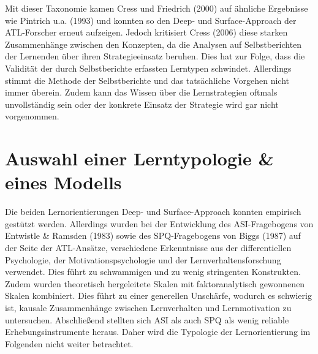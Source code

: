     Mit dieser Taxonomie kamen Cress und Friedrich (2000) auf ähnliche Ergebnisse wie Pintrich u.a. (1993) und konnten so den Deep- und Surface-Approach der ATL-Forscher erneut aufzeigen. Jedoch kritisiert Cress (2006) diese starken Zusammenhänge zwischen den Konzepten, da die Analysen auf Selbstberichten der Lernenden über ihren Strategieeinsatz beruhen. Dies hat zur Folge, dass die Validität der durch Selbstberichte erfassten 
    Lerntypen schwindet. \parencite[370 f.]{Cress.2006} \parencite[15 f.]{Martin.2012} Allerdings stimmt die Methode der Selbstberichte und das tatsächliche Vorgehen nicht immer 
    überein. Zudem kann das Wissen über die Lernstrategien oftmals unvollständig sein oder der konkrete Einsatz der Strategie wird gar nicht vorgenommen. \parencite[148]{Looss.2007}\nocite{Pintrich.1993}

    \section{Auswahl einer Lerntypologie \& eines Modells} \label{AuswahlLernstilmodell}
 
    Die beiden Lernorientierungen Deep- und Surface-Approach konnten empirisch gestützt werden. Allerdings 
    wurden bei der Entwicklung des ASI-Fragebogens von Entwistle \& Ramsden (1983) sowie des SPQ-Fragebogens von Biggs (1987) auf der Seite der ATL-Ansätze,
    verschiedene Erkenntnisse aus der differentiellen Psychologie, der Motivationspsychologie und der Lernverhaltensforschung verwendet.
    Dies führt zu schwammigen und zu wenig stringenten Konstrukten. Zudem wurden theoretisch hergeleitete Skalen mit 
    faktoranalytisch gewonnenen Skalen kombiniert. Dies führt zu einer generellen Unschärfe, wodurch es schwierig ist, kausale Zusammenhänge zwischen Lernverhalten und Lernmotivation
    zu untersuchen. Abschließend stellten sich ASI als auch SPQ als wenig reliable Erhebungsinstrumente heraus. \parencite[10]{Martin.2012} Daher wird die Typologie der Lernorientierung im Folgenden 
    nicht weiter betrachtet.
    
